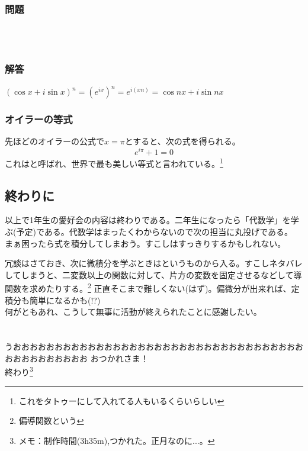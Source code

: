 \documentclass[a4j,dvipdfmx]{jsarticle}
\begin{document}
\subsubsection*{問題}
\\\\
\subsubsection*{解答}
$(\cos x+i\sin x)^n=(e^{ix})^n=e^{i(xn)}=\cos nx+i\sin nx$
\\
\subsubsection*{オイラーの等式}
先ほどのオイラーの公式で$x=\pi$とすると、次の式を得られる。
\begin{equation}
    e^{i\pi}+1=0
\end{equation}
これはと呼ばれ、世界で最も美しい等式と言われている。\footnote{これをタトゥーにして入れてる人もいるくらいらしい}
\newpage
\subsection{終わりに}
以上で1年生の愛好会の内容は終わりである。二年生になったら「代数学」を学ぶ(予定)である。代数学はまったくわからないので次の担当に丸投げである。
まぁ困ったら式を積分してしまおう。すこしはすっきりするかもしれない。

冗談はさておき、次に微積分を学ぶときはというものから入る。すこしネタバレしてしまうと、二変数以上の関数に対して、片方の変数を固定させるなどして導関数を求めたりする。\footnote{偏導関数という}
正直そこまで難しくない(はず)。偏微分が出来れば、定積分も簡単になるかも(!?)\\

何がともあれ、こうして無事に活動が終えられたことに感謝したい。\\\\\\

うおおおおおおおおおおおおおおおおおおおおおおおおおおおおおおおおおおおおおおおおおおおおお
\centering
\Huge{おつかれさま！}
\normalsize
\\
終わり\footnote{メモ：制作時間(3h35m),つかれた。正月なのに...。}
\end{document}
